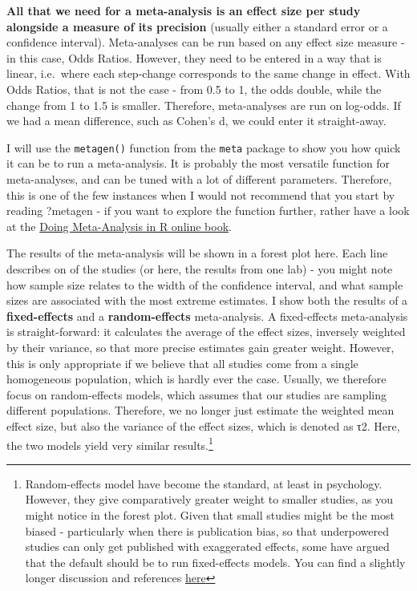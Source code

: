 \documentclass[
]{book}
\begin{document}
\textbf{All that we need for a meta-analysis is an effect size per study alongside a measure of its precision} (usually either a standard error or a confidence interval). Meta-analyses can be run based on any effect size measure - in this case, Odds Ratios. However, they need to be entered in a way that is linear, i.e.~where each step-change corresponds to the same change in effect. With Odds Ratios, that is not the case - from 0.5 to 1, the odds double, while the change from 1 to 1.5 is smaller. Therefore, meta-analyses are run on log-odds. If we had a mean difference, such as Cohen's d, we could enter it straight-away.

I will use the \texttt{metagen()} function from the \texttt{meta} package to show you how quick it can be to run a meta-analysis. It is probably the most versatile function for meta-analyses, and can be tuned with a lot of different parameters. Therefore, this is one of the few instances when I would not recommend that you start by reading ?metagen - if you want to explore the function further, rather have a look at the \href{https://bookdown.org/MathiasHarrer/Doing_Meta_Analysis_in_R}{Doing Meta-Analysis in R online book}.

The results of the meta-analysis will be shown in a forest plot here. Each line describes on of the studies (or here, the results from one lab) - you might note how sample size relates to the width of the confidence interval, and what sample sizes are associated with the most extreme estimates. I show both the results of a \textbf{fixed-effects} and a \textbf{random-effects} meta-analysis. A fixed-effects meta-analysis is straight-forward: it calculates the average of the effect sizes, inversely weighted by their variance, so that more precise estimates gain greater weight. However, this is only appropriate if we believe that all studies come from a single homogeneous population, which is hardly ever the case. Usually, we therefore focus on random-effects models, which assumes that our studies are sampling different populations. Therefore, we no longer just estimate the weighted mean effect size, but also the variance of the effect sizes, which is denoted as τ2. Here, the two models yield very similar results.\footnote{Random-effects model have become the standard, at least in psychology. However, they give comparatively greater weight to smaller studies, as you might notice in the forest plot. Given that small studies might be the most biased - particularly when there is publication bias, so that underpowered studies can only get published with exaggerated effects, some have argued that the default should be to run fixed-effects models. You can find a slightly longer discussion and references \href{https://bookdown.org/MathiasHarrer/Doing_Meta_Analysis_in_R/random.html}{here}}
\end{document}
